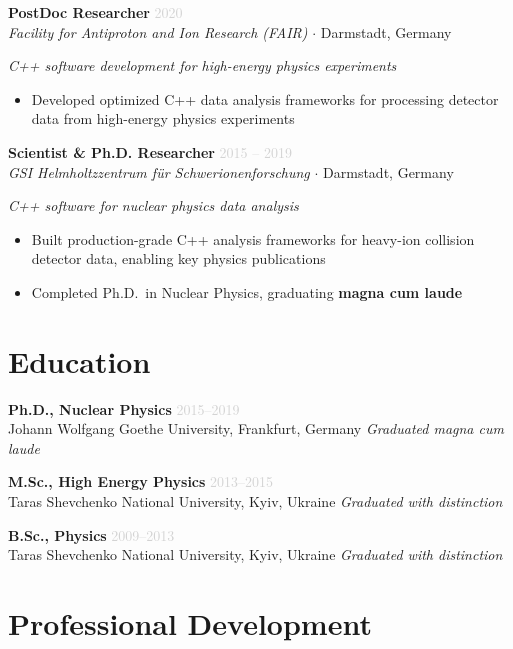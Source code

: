 \documentclass[11pt, a4paper]{article}
\newcommand{\jobtitle}[4]{%
  \noindent
  \textbf{#1} \hfill \textcolor{lightgray}{#4}\\
  \textit{#2} $\cdot$ #3
  \vspace{3pt}
}
\begin{document}
\vspace{6pt}
\jobtitle{PostDoc Researcher}{Facility for Antiproton and Ion Research (FAIR)}{Darmstadt, Germany}{2020}
\textit{\small C++ software development for high-energy physics experiments}
\begin{itemize}
  \item Developed optimized C++ data analysis frameworks for processing detector data from high-energy physics experiments
\end{itemize}

\vspace{6pt}
\jobtitle{Scientist \& Ph.D. Researcher}{GSI Helmholtzzentrum für Schwerionenforschung}{Darmstadt, Germany}{2015 -- 2019}
\textit{\small C++ software for nuclear physics data analysis}
\begin{itemize}
  \item Built production-grade C++ analysis frameworks for heavy-ion collision detector data, enabling key physics publications
  \item Completed Ph.D.\ in Nuclear Physics, graduating \textbf{magna cum laude}
\end{itemize}

\section{Education}

\noindent
\textbf{Ph.D., Nuclear Physics} \hfill \textcolor{lightgray}{2015--2019}\\
Johann Wolfgang Goethe University, Frankfurt, Germany \quad \textit{Graduated magna cum laude}

\vspace{5pt}
\noindent
\textbf{M.Sc., High Energy Physics} \hfill \textcolor{lightgray}{2013--2015}\\
Taras Shevchenko National University, Kyiv, Ukraine \quad \textit{Graduated with distinction}

\vspace{5pt}
\noindent
\textbf{B.Sc., Physics} \hfill \textcolor{lightgray}{2009--2013}\\
Taras Shevchenko National University, Kyiv, Ukraine \quad \textit{Graduated with distinction}

\section{Professional Development}
\end{document}
